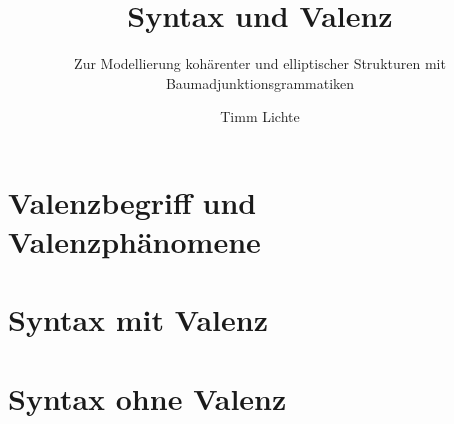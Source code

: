 \documentclass[ number=1
			   ,series=eotms
			   ,output=short    %
			   ,newtxmath
         ,bibtex 
			  ]{LSP/langsci}
\title{Syntax \newlineCover und Valenz}
\subtitle{Zur Modellierung kohärenter und elliptischer Strukturen mit Baumadjunktionsgrammatiken}
\author{Timm Lichte}
\begin{document}
               
                                                                                                            
\maketitle

\frontmatter

\tableofcontents






\mainmatter      
        


\part{Valenzbegriff und Valenzphänomene} 


    

\part{Syntax mit Valenz}


  
  

\part{Syntax ohne Valenz} 





\backmatter





\newpage
{}%
\printindex 
  

\newpage
{}%

\begin{sloppypar} 
\begin{RaggedRight}
\printindex[sbj] 
\end{RaggedRight}
\end{sloppypar} 

                              
\end{document}
